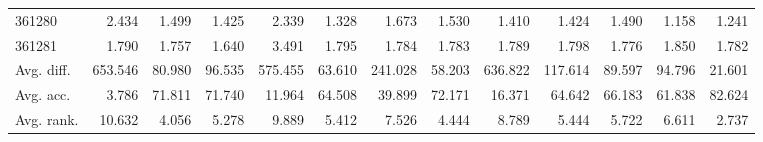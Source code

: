 \begin{tabular}{lrrrrrrrrrrrr}
361280 & 2.434 & 1.499 & 1.425 & 2.339 & 1.328 & 1.673 & 1.530 & 1.410 & 1.424 & 1.490 & 1.158 & 1.241 \\
361281 & 1.790 & 1.757 & 1.640 & 3.491 & 1.795 & 1.784 & 1.783 & 1.789 & 1.798 & 1.776 & 1.850 & 1.782 \\
Avg. diff. & 653.546 & 80.980 & 96.535 & 575.455 & 63.610 & 241.028 & 58.203 & 636.822 & 117.614 & 89.597 & 94.796 & 21.601 \\
Avg. acc. & 3.786 & 71.811 & 71.740 & 11.964 & 64.508 & 39.899 & 72.171 & 16.371 & 64.642 & 66.183 & 61.838 & 82.624 \\
Avg. rank. & 10.632 & 4.056 & 5.278 & 9.889 & 5.412 & 7.526 & 4.444 & 8.789 & 5.444 & 5.722 & 6.611 & 2.737 \\
\bottomrule
\end{tabular}
